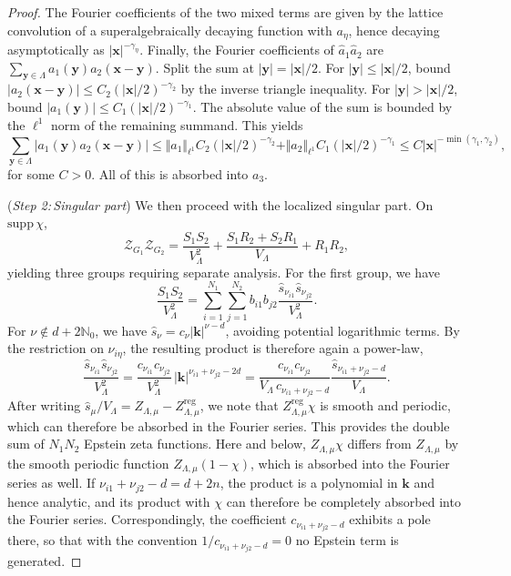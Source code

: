 \documentclass[10pt,a4paper]{amsart}
\begin{document}
\begin{proof}
The Fourier coefficients of the two mixed terms are given by the lattice convolution of a superalgebraically decaying function with $a_\eta$, hence decaying asymptotically as $|\bm x|^{-\gamma_\eta}$. 
Finally, the Fourier coefficients of $\hat a_1 \hat a_2$ are $\sum_{\bm y\in \Lambda}a_1(\bm y)a_2(\bm x-\bm y)$. Split the sum at $|\bm y|=|\bm x|/2$. For $|\bm y|\le |\bm x|/2$, bound $|a_2(\bm x-\bm y)|\le C_2(|\bm x|/2)^{-\gamma_2}$ by the inverse triangle inequality. For $|\bm y|>|\bm x|/2$, bound $|a_1(\bm y)|\le C_1 (|\bm x|/2)^{-\gamma_1}$. The absolute value of the sum is bounded by the $\ell^1$ norm of the remaining summand. This yields
\[
\sum_{\bm y\in \Lambda}|a_1(\bm y) a_2(\bm x-\bm y)|\le \Vert a_1\Vert_{\ell^1}C_2(|\bm x|/2)^{-\gamma_2}+\Vert a_2\Vert_{\ell^1}C_1(|\bm x|/2)^{-\gamma_1}\le C |\bm x|^{-\min(\gamma_1,\gamma_2)},
\]
for some $C>0$. All of this is absorbed into $a_3$.

(\emph{Step 2:\,Singular part}) We then proceed with the localized singular part. On $\mathrm{supp}\,\chi$,
\[
\mathcal Z_{G_1}\mathcal Z_{G_2}
=\frac{S_1S_2}{V_\Lambda^{2}}
+\frac{S_1R_2+S_2R_1}{V_\Lambda}
+R_1R_2,
\]
yielding three groups requiring separate analysis. 
For the first group, we have
\[
\frac{S_1S_2}{V_\Lambda^{2}}=\sum_{i=1}^{N_1}\sum_{j=1}^{N_2}b_{i1}b_{j2} \frac{\hat s_{\nu_{i1}}\hat s_{\nu_{j2}}}{V_\Lambda^{2}}.
\]
For $\nu\notin d+2\mathds N_0$, we have $\hat s_\nu=c_\nu|\bm k|^{\nu-d}$, avoiding potential logarithmic terms. By the restriction on $\nu_{i\eta}$, the resulting product is therefore again a power-law,
\[
\frac{\hat s_{\nu_{i1}}\hat s_{\nu_{j2}}}{V_\Lambda^{2}}=\frac{c_{\nu_{i1}}c_{\nu_{j2}}}{V_\Lambda^{2}}\,|\bm k|^{\nu_{i1}+\nu_{j2}-2d}=\frac{c_{\nu_{i1}}c_{\nu_{j2}}}{V_\Lambda\,c_{\nu_{i1}+\nu_{j2}-d}}\frac{\hat s_{\nu_{i1}+\nu_{j2}-d}}{V_\Lambda}.
\]
After writing $\hat s_\mu/V_\Lambda=Z_{\Lambda,\mu}-Z^{\mathrm{reg}}_{\Lambda,\mu}$, we note that $Z^{\mathrm{reg}}_{\Lambda,\mu}\chi$ is smooth and periodic, which can therefore be absorbed in the Fourier series. This provides the double sum of $N_1N_2$ Epstein zeta functions. Here and below, $Z_{\Lambda,\mu}\chi$ differs from $Z_{\Lambda,\mu}$ by the smooth periodic function $Z_{\Lambda,\mu}(1-\chi)$, which is absorbed into the Fourier series as well. If $\nu_{i1}+\nu_{j2}-d=d+2n$, the product is a polynomial in $\bm k$ and hence analytic, and its product with $\chi$ can therefore be completely absorbed into the Fourier series. Correspondingly, the coefficient $c_{\nu_{i1}+\nu_{j2}-d}$ exhibits a pole there, so that with the convention $1/c_{\nu_{i1}+\nu_{j2}-d}=0$ no Epstein term is generated.


\end{proof}
\end{document}
